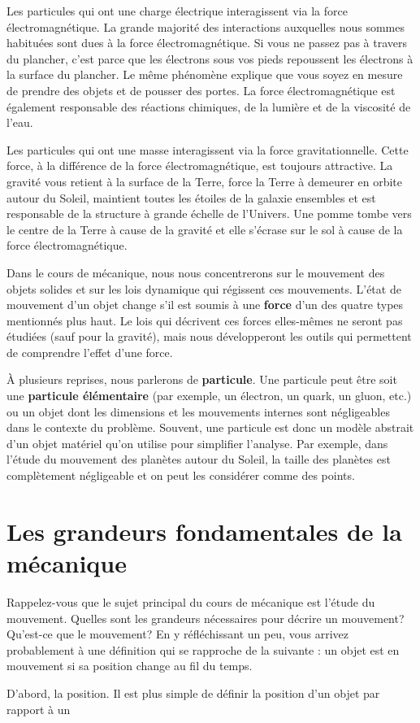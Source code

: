 Les particules qui ont une charge électrique interagissent via la force
électromagnétique.  La grande majorité des interactions auxquelles nous sommes
habituées sont dues à la force électromagnétique.  Si vous ne passez pas à
travers du plancher, c'est parce que les électrons sous vos pieds repoussent
les électrons à la surface du plancher.  Le même phénomène explique que vous
soyez en mesure de prendre des objets et de pousser des portes.  La force
électromagnétique est également responsable des réactions chimiques, de la
lumière et de la viscosité de l'eau.

Les particules qui ont une masse interagissent via la force gravitationnelle.
Cette force, à la différence de la force électromagnétique, est toujours
attractive.  La gravité vous retient à la surface de la Terre, force la Terre à
demeurer en orbite autour du Soleil, maintient toutes les étoiles de la galaxie
ensembles et est responsable de la structure à grande échelle de l'Univers.
Une pomme tombe vers le centre de la Terre à cause de la gravité et elle
s'écrase sur le sol à cause de la force électromagnétique.

Dans le cours de mécanique, nous nous concentrerons sur le mouvement des objets
solides et sur les lois dynamique qui régissent ces mouvements.  L'état de
mouvement d'un objet change s'il est soumis à une \textbf{force} d'un des quatre
types mentionnés plus haut.  Le lois qui décrivent ces forces elles-mêmes ne
seront pas étudiées (sauf pour la gravité), mais nous développeront les outils
qui permettent de comprendre l'effet d'une force.

À plusieurs reprises, nous parlerons de \textbf{particule}.  Une particule peut
être soit une \textbf{particule élémentaire} (par exemple, un électron, un
quark, un gluon, etc.) ou un objet dont les dimensions et les mouvements
internes sont négligeables dans le contexte du problème.  Souvent, une
particule est donc un modèle abstrait d'un objet matériel qu'on utilise pour
simplifier l'analyse.  Par exemple, dans l'étude du mouvement des planètes
autour du Soleil, la taille des planètes est complètement négligeable et on
peut les considérer comme des points.


\section{Les grandeurs fondamentales de la mécanique}

Rappelez-vous que le sujet principal du cours de mécanique est l'étude du
mouvement.  Quelles sont les grandeurs nécessaires pour décrire un mouvement?
Qu'est-ce que le mouvement?  En y réfléchissant un peu, vous arrivez
probablement à une définition qui se rapproche de la suivante : un objet est en
mouvement si sa position change au fil du temps.

D'abord, la position.  Il est plus simple de définir la position d'un objet par
rapport à un

